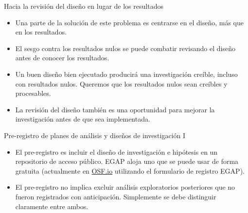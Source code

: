 \documentclass[
  ignorenonframetext,
]{beamer}
\begin{document}
\begin{frame}{Hacia la revisión del diseño en lugar de los resultados}
\protect\hypertarget{hacia-la-revisiuxf3n-del-diseuxf1o-en-lugar-de-los-resultados}{}
\begin{itemize}
\item
  Una parte de la solución de este problema es centrarse en el diseño,
  más que en los resultados.
\item
  El sesgo contra los resultados nulos se puede combatir revisando el
  diseño antes de conocer los resultados.
\item
  Un buen diseño bien ejecutado producirá una investigación creíble,
  incluso con resultados nulos. Queremos que los resultados nulos sean
  creíbles y procesables.
\item
  La revisión del diseño también es una oportunidad para mejorar la
  investigación antes de que sea implementada.
\end{itemize}
\end{frame}

\begin{frame}{Pre-registro de planes de análisis y diseños de
investigación I}
\protect\hypertarget{pre-registro-de-planes-de-anuxe1lisis-y-diseuxf1os-de-investigaciuxf3n-i}{}
\begin{itemize}
\item
  El pre-registro es incluir el diseño de investigación e hipótesis en
  un repositorio de acceso público. EGAP aloja uno que se puede usar de
  forma gratuita (actualmente en \href{https://osf.io}{OSF.io}
  utilizando el formulario de registro EGAP).
\item
  El pre-registro no implica excluir análisis exploratorios posteriores
  que no fueron registrados con anticipación. Simplemente se debe
  distinguir claramente entre ambos.
\end{itemize}
\end{frame}
\end{document}
